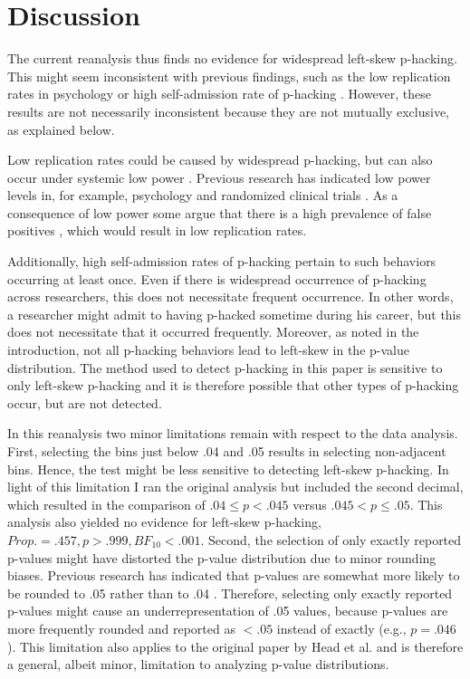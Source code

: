 \section*{Discussion} 
The current reanalysis thus finds no evidence for widespread left-skew p-hacking. This might seem inconsistent with previous findings, such as the low replication rates in psychology \cite{Baker_2015-qd} or high self-admission rate of p-hacking \cite{John2012-uj}. However, these results are not necessarily inconsistent because they are not mutually exclusive, as explained below. 

Low replication rates could be caused by widespread p-hacking, but can also occur under systemic low power \cite{Bakker2014-lr,Bakker_2012}. Previous research has indicated low power levels in, for example, psychology \cite{Cohen1962-jc,Sedlmeier1989-yc} and randomized clinical trials \cite{Moher1994-ra}. As a consequence of low power some argue that there is a high prevalence of false positives \cite{Ioannidis2005-am}, which would result in low replication rates.

Additionally, high self-admission rates of p-hacking \cite{John2012-uj} pertain to such behaviors occurring at least once. Even if there is widespread occurrence of p-hacking across researchers, this does not necessitate frequent occurrence. In other words, a researcher might admit to having p-hacked sometime during his career, but this does not necessitate that it occurred frequently. Moreover, as noted in the introduction, not all p-hacking behaviors lead to left-skew in the p-value distribution. The method used to detect p-hacking in this paper is sensitive to only left-skew p-hacking and it is therefore possible that other types of p-hacking occur, but are not detected.

In this reanalysis two minor limitations remain with respect to the data analysis. First, selecting the bins just below .04 and .05 results in selecting non-adjacent bins. Hence, the test might be less sensitive to detecting left-skew p-hacking. In light of this limitation I ran the original analysis but included the second decimal, which resulted in the comparison of $.04\leq p<.045$ versus $.045<p\leq.05$. This analysis also yielded no evidence for left-skew p-hacking, $Prop.=.457,p>.999,BF_{10}<.001$. Second, the selection of only exactly reported p-values might have distorted the p-value distribution due to minor rounding biases. Previous research has indicated that p-values are somewhat more likely to be rounded to .05 rather than to .04 \cite{Krawczyk2015-uh}. Therefore, selecting only exactly reported p-values might cause an underrepresentation of .05 values, because p-values are more frequently rounded and reported as $<.05$ instead of exactly (e.g., $p=.046$). This limitation also applies to the original paper by Head et al. and is therefore a general, albeit minor, limitation to analyzing p-value distributions.

